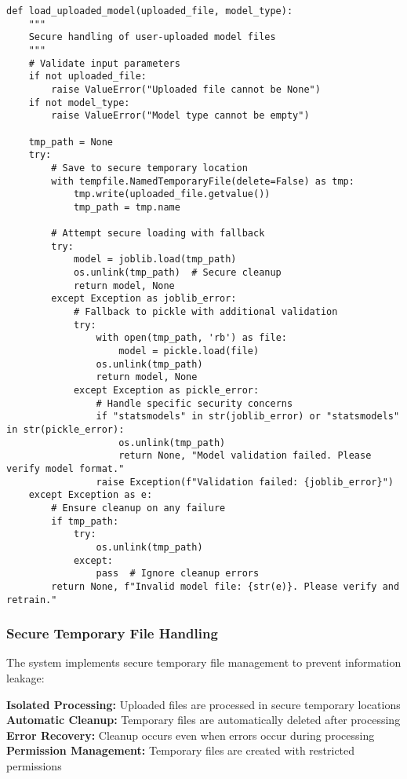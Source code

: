 \begin{lstlisting}[language=MyPython, caption={Comprehensive Input Validation}]
def load_uploaded_model(uploaded_file, model_type):
    """
    Secure handling of user-uploaded model files
    """
    # Validate input parameters
    if not uploaded_file:
        raise ValueError("Uploaded file cannot be None")
    if not model_type:
        raise ValueError("Model type cannot be empty")
    
    tmp_path = None
    try:
        # Save to secure temporary location
        with tempfile.NamedTemporaryFile(delete=False) as tmp:
            tmp.write(uploaded_file.getvalue())
            tmp_path = tmp.name
        
        # Attempt secure loading with fallback
        try:
            model = joblib.load(tmp_path)
            os.unlink(tmp_path)  # Secure cleanup
            return model, None
        except Exception as joblib_error:
            # Fallback to pickle with additional validation
            try:
                with open(tmp_path, 'rb') as file:
                    model = pickle.load(file)
                os.unlink(tmp_path)
                return model, None
            except Exception as pickle_error:
                # Handle specific security concerns
                if "statsmodels" in str(joblib_error) or "statsmodels" in str(pickle_error):
                    os.unlink(tmp_path)
                    return None, "Model validation failed. Please verify model format."
                raise Exception(f"Validation failed: {joblib_error}")
    except Exception as e:
        # Ensure cleanup on any failure
        if tmp_path:
            try:
                os.unlink(tmp_path)
            except:
                pass  # Ignore cleanup errors
        return None, f"Invalid model file: {str(e)}. Please verify and retrain."
\end{lstlisting}

\subsubsection{Secure Temporary File Handling}

The system implements secure temporary file management to prevent information leakage:

\textbf{Isolated Processing:} Uploaded files are processed in secure temporary locations
\textbf{Automatic Cleanup:} Temporary files are automatically deleted after processing
\textbf{Error Recovery:} Cleanup occurs even when errors occur during processing
\textbf{Permission Management:} Temporary files are created with restricted permissions

